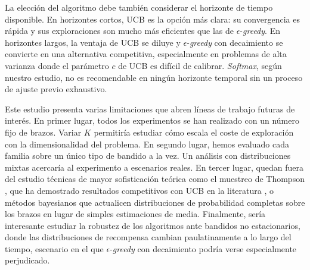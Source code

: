 La elección del algoritmo debe también considerar el horizonte de tiempo disponible. En horizontes cortos, UCB es la opción más clara: su convergencia es rápida y sus exploraciones son mucho más eficientes que las de $\epsilon$-\textit{greedy}. En horizontes largos, la ventaja de UCB se diluye y $\epsilon$-\textit{greedy} con decaimiento se convierte en una alternativa competitiva, especialmente en problemas de alta varianza donde el parámetro $c$ de UCB es difícil de calibrar. \textit{Softmax}, según nuestro estudio, no es recomendable en ningún horizonte temporal sin un proceso de ajuste previo exhaustivo.

Este estudio presenta varias limitaciones que abren líneas de trabajo futuras de interés. En primer lugar, todos los experimentos se han realizado con un número fijo de brazos. Variar $K$ permitiría estudiar cómo escala el coste de exploración con la dimensionalidad del problema. En segundo lugar, hemos evaluado cada familia sobre un único tipo de bandido a la vez. Un análisis con distribuciones mixtas acercaría al experimento a escenarios reales. En tercer lugar, quedan fuera del estudio técnicas de mayor sofisticación teórica como el muestreo de Thompson \cite{thompson1933}, que ha demostrado resultados competitivos con UCB en la literatura \cite{russo2018}, o métodos bayesianos que actualicen distribuciones de probabilidad completas sobre los brazos en lugar de simples estimaciones de media. Finalmente, sería interesante estudiar la robustez de los algoritmos ante bandidos no estacionarios, donde las distribuciones de recompensa cambian paulatinamente a lo largo del tiempo, escenario en el que $\epsilon$-\textit{greedy} con decaimiento podría verse especialmente perjudicado. 